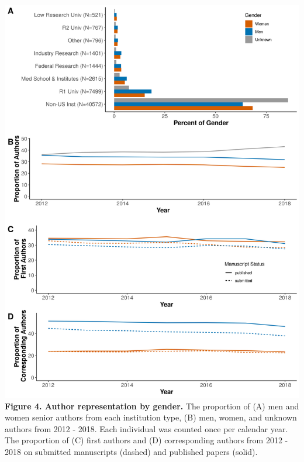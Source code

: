 \documentclass[11pt,]{article}
\begin{document}
\newpage

\includegraphics{Figure_3.png} \textbf{Figure 4. Author representation
by gender.} The proportion of (A) men and women senior authors from each
institution type, (B) men, women, and unknown authors from 2012 - 2018.
Each individual was counted once per calendar year. The proportion of
(C) first authors and (D) corresponding authors from 2012 - 2018 on
submitted manuscripts (dashed) and published papers (solid).

\newpage
\end{document}
